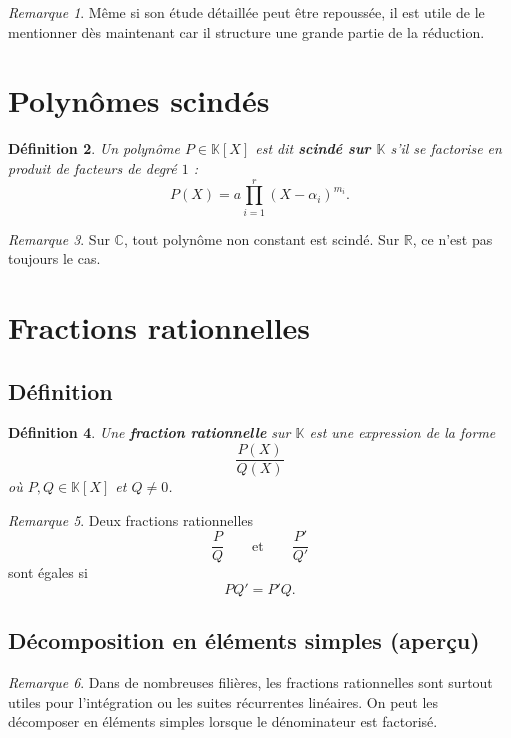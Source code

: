 \documentclass[11pt,a4paper]{article}
\newtheorem{definition}{Définition}[section]
\theoremstyle{remark}
\newtheorem{remarque}[definition]{Remarque}
\newcommand{\R}{\mathbb{R}}
\newcommand{\C}{\mathbb{C}}
\newcommand{\K}{\mathbb{K}}
\begin{document}
\begin{remarque}
Même si son étude détaillée peut être repoussée, il est utile de le mentionner dès maintenant car il structure une grande partie de la réduction.
\end{remarque}

\section{Polynômes scindés}

\begin{definition}
Un polynôme \(P\in\K[X]\) est dit \textbf{scindé sur \(\K\)} s’il se factorise en produit de facteurs de degré \(1\) :
\[
P(X)=a\prod_{i=1}^r (X-\alpha_i)^{m_i}.
\]
\end{definition}

\begin{remarque}
Sur \(\C\), tout polynôme non constant est scindé.  
Sur \(\R\), ce n’est pas toujours le cas.
\end{remarque}

\section{Fractions rationnelles}

\subsection{Définition}

\begin{definition}
Une \textbf{fraction rationnelle} sur \(\K\) est une expression de la forme
\[
\frac{P(X)}{Q(X)}
\]
où \(P,Q\in\K[X]\) et \(Q\neq 0\).
\end{definition}

\begin{remarque}
Deux fractions rationnelles
\[
\frac{P}{Q}
\qquad \text{et} \qquad
\frac{P'}{Q'}
\]
sont égales si
\[
PQ'=P'Q.
\]
\end{remarque}

\subsection{Décomposition en éléments simples (aperçu)}

\begin{remarque}
Dans de nombreuses filières, les fractions rationnelles sont surtout utiles pour l’intégration ou les suites récurrentes linéaires. On peut les décomposer en éléments simples lorsque le dénominateur est factorisé.
\end{remarque}
\end{document}
